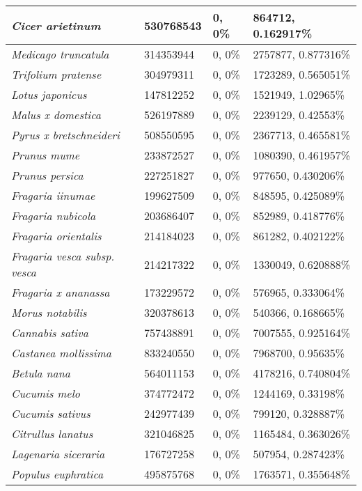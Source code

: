 {\begin{longtable}{| L{4cm} | L{2.7cm}  | L{3.7cm} | L{3.7cm} |}
\textit{Cicer arietinum} & 530768543 & 0, 0\% & 864712, 0.162917\% \\ \hline
\textit{Medicago truncatula} & 314353944 & 0, 0\% & 2757877, 0.877316\% \\ \hline
\textit{Trifolium pratense} & 304979311 & 0, 0\% & 1723289, 0.565051\% \\ \hline
\textit{Lotus japonicus} & 147812252 & 0, 0\% & 1521949, 1.02965\% \\ \hline
\textit{Malus x domestica} & 526197889 & 0, 0\% & 2239129, 0.42553\% \\ \hline
\textit{Pyrus x bretschneideri} & 508550595 & 0, 0\% & 2367713, 0.465581\% \\ \hline
\textit{Prunus mume} & 233872527 & 0, 0\% & 1080390, 0.461957\% \\ \hline
\textit{Prunus persica} & 227251827 & 0, 0\% & 977650, 0.430206\% \\ \hline
\textit{Fragaria iinumae} & 199627509 & 0, 0\% & 848595, 0.425089\% \\ \hline
\textit{Fragaria nubicola} & 203686407 & 0, 0\% & 852989, 0.418776\% \\ \hline
\textit{Fragaria orientalis} & 214184023 & 0, 0\% & 861282, 0.402122\% \\ \hline
\textit{Fragaria vesca subsp. vesca} & 214217322 & 0, 0\% & 1330049, 0.620888\% \\ \hline
\textit{Fragaria x ananassa} & 173229572 & 0, 0\% & 576965, 0.333064\% \\ \hline
\textit{Morus notabilis} & 320378613 & 0, 0\% & 540366, 0.168665\% \\ \hline
\textit{Cannabis sativa} & 757438891 & 0, 0\% & 7007555, 0.925164\% \\ \hline
\textit{Castanea mollissima} & 833240550 & 0, 0\% & 7968700, 0.95635\% \\ \hline
\textit{Betula nana} & 564011153 & 0, 0\% & 4178216, 0.740804\% \\ \hline
\textit{Cucumis melo} & 374772472 & 0, 0\% & 1244169, 0.33198\% \\ \hline
\textit{Cucumis sativus} & 242977439 & 0, 0\% & 799120, 0.328887\% \\ \hline
\textit{Citrullus lanatus} & 321046825 & 0, 0\% & 1165484, 0.363026\% \\ \hline
\textit{Lagenaria siceraria} & 176727258 & 0, 0\% & 507954, 0.287423\% \\ \hline
\textit{Populus euphratica} & 495875768 & 0, 0\% & 1763571, 0.355648\% \\ \hline

\end{longtable}}
